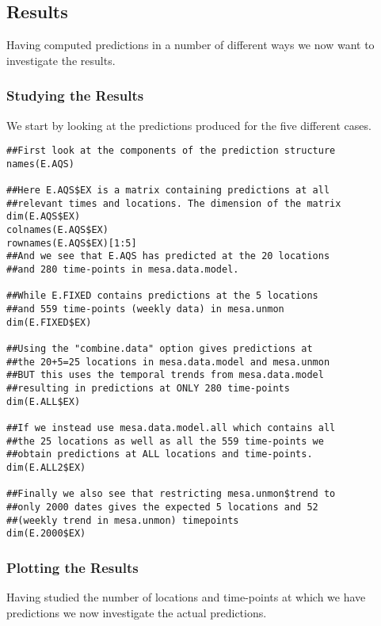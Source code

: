 \subsection{Results}
Having computed predictions in a number of different ways we 
now want to investigate the results.
\subsubsection{Studying the Results}
We start by looking at the predictions produced for the five different cases.
\vspace*{-0.5\baselineskip}
\begin{verbatim}
##First look at the components of the prediction structure
names(E.AQS)

##Here E.AQS$EX is a matrix containing predictions at all 
##relevant times and locations. The dimension of the matrix 
dim(E.AQS$EX)
colnames(E.AQS$EX)
rownames(E.AQS$EX)[1:5]
##And we see that E.AQS has predicted at the 20 locations 
##and 280 time-points in mesa.data.model.

##While E.FIXED contains predictions at the 5 locations 
##and 559 time-points (weekly data) in mesa.unmon
dim(E.FIXED$EX)

##Using the "combine.data" option gives predictions at 
##the 20+5=25 locations in mesa.data.model and mesa.unmon 
##BUT this uses the temporal trends from mesa.data.model 
##resulting in predictions at ONLY 280 time-points
dim(E.ALL$EX)

##If we instead use mesa.data.model.all which contains all 
##the 25 locations as well as all the 559 time-points we 
##obtain predictions at ALL locations and time-points.
dim(E.ALL2$EX)

##Finally we also see that restricting mesa.unmon$trend to 
##only 2000 dates gives the expected 5 locations and 52 
##(weekly trend in mesa.unmon) timepoints
dim(E.2000$EX)
\end{verbatim}

\subsubsection{Plotting the Results}
Having studied the number of locations and time-points at which we 
have predictions we now investigate the actual predictions. 

